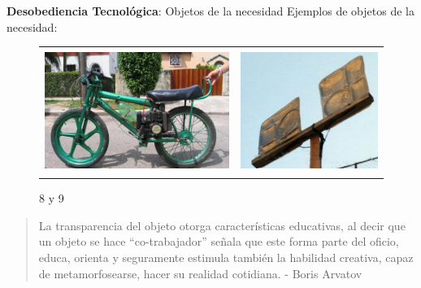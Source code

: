 \documentclass[spanish]{beamer}
\begin{document}
\begin{frame}{\textbf{Desobediencia Tecnológica}: Objetos de la necesidad}
    Ejemplos de objetos de la necesidad:
    
    \begin{figure} 
        \begin{tabular}{cc}        
            \includegraphics[height=4cm]{img/inventos/rikimbili.jpg}& \includegraphics[height=4cm]{img/inventos/antena_bandejas.jpg} \\
        \end{tabular}
        \caption{8 y 9}
    \end{figure}
    
\end{frame}

\begin{frame}
    \begin{quote}
        La transparencia del objeto otorga características educativas, al decir que un objeto se hace “co-trabajador” señala que este forma parte del oficio, educa, orienta y seguramente estimula también la habilidad creativa, capaz de metamorfosearse, hacer su realidad cotidiana. - Boris Arvatov
    \end{quote}
\end{frame}
\end{document}

